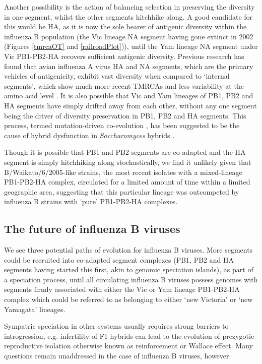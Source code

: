 \documentclass[11pt,oneside,letterpaper]{article}
\begin{document}
Another possibility is the action of balancing selection in preserving the diversity in one segment, whilst the other segments hitchhike along.
A good candidate for this would be HA, as it is now the sole bearer of antigenic diversity within the influenza B population (the Vic lineage NA segment having gone extinct in 2002 (Figures \ref{tmrcaOT} and \ref{railroadPlot})), until the Yam lineage NA segment under Vic PB1-PB2-HA recovers sufficient antigenic diversity.
Previous research has found that avian influenza A virus HA and NA segments, which are the primary vehicles of antigenicity, exhibit vast diversity when compared to `internal segments', which show much more recent TMRCAs and less variability at the amino acid level \cite{chen2006,obenauer2006}.
It is also possible that Vic and Yam lineages of PB1, PB2 and HA segments have simply drifted away from each other, without any one segment being the driver of diversity preservation in PB1, PB2 and HA segments.
This process, termed mutation-driven co-evolution \cite{presgraves2010}, has been suggested to be the cause of hybrid dysfunction in \textit{Saccharomyces} hybrids \cite{lee2008}.

Though it is possible that PB1 and PB2 segments are co-adapted and the HA segment is simply hitchhiking along stochastically, we find it unlikely given that B/Waikato/6/2005-like strains, the most recent isolates with a mixed-lineage PB1-PB2-HA complex, circulated for a limited amount of time within a limited geographic area, suggesting that this particular lineage was outcompeted by influenza B strains with `pure' PB1-PB2-HA complexes.

\subsection*{The future of influenza B viruses}
We see three potential paths of evolution for influenza B viruses.
More segments could be recruited into co-adapted segment complexes (PB1, PB2 and HA segments having started this first, akin to genomic speciation islands), as part of a speciation process, until all circulating influenza B viruses possess genomes with segments firmly associated with either the Vic or Yam lineage PB1-PB2-HA complex which could be referred to as belonging to either `new Victoria' or `new Yamagata' lineages.

Sympatric speciation in other systems usually requires strong barriers to introgression, e.g. infertility of F1 hybrids can lead to the evolution of prezygotic reproductive isolation otherwise known as reinforcement or Wallace effect.
Many questions remain unaddressed in the case of influenza B viruses, however.
\end{document}
